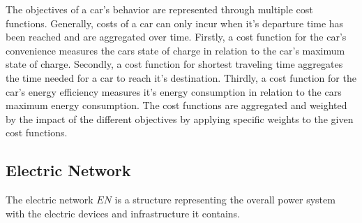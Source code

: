 The objectives of a car's behavior are represented through multiple cost functions. Generally, costs of a car can only incur when it's departure time has been reached and are aggregated over time. %
Firstly, a cost function for the car's convenience measures the cars state of charge in relation to the car's maximum state of charge. Secondly, a cost function for shortest traveling time aggregates the time needed for a car to reach it's destination. Thirdly, a cost function for the car's energy efficiency measures it's energy consumption in relation to the cars maximum energy consumption. The cost functions are aggregated and weighted by the impact of the different objectives by applying specific weights to the given cost functions.

\subsection{Electric Network}

The electric network $EN$ is a structure representing the overall power system with the electric devices and infrastructure it contains.

